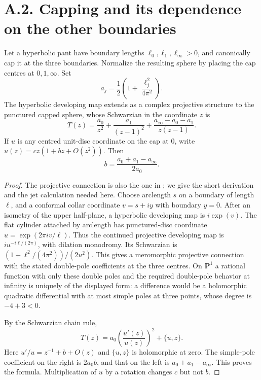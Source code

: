 \section{A.2. Capping and its dependence on the other boundaries}
\begin{proposition}\label{A2-schwarzian}
Let a hyperbolic pant have boundary lengths $\ell_0,\ell_1,\ell_\infty>0$, and canonically cap it at the three boundaries. Normalize the resulting sphere by placing the cap centres at $0,1,\infty$. Set
\[
a_j=\frac12\left(1+\frac{\ell_j^2}{4\pi^2}\right).
\]
The hyperbolic developing map extends as a complex projective structure to the punctured capped sphere, whose Schwarzian in the coordinate $z$ is
\[
T(z)=\frac{a_0}{z^2}+\frac{a_1}{(z-1)^2}
       +\frac{a_\infty-a_0-a_1}{z(z-1)}.
\]
If $u$ is any centred unit-disc coordinate on the cap at $0$, write $u(z)=c z(1+bz+O(z^2))$. Then
\[
b=\frac{a_0+a_1-a_\infty}{2a_0}.
\]
\end{proposition}
\begin{proof}
The projective connection is also the one in \cite[equation (1.3)]{AFirat2021}; we give the short derivation and the jet calculation needed here. Choose arclength $s$ on a boundary of length $\ell$, and a conformal collar coordinate $v=s+iy$ with boundary $y=0$. After an isometry of the upper half-plane, a hyperbolic developing map is $i\exp(v)$. The flat cylinder attached by arclength has punctured-disc coordinate $u=\exp(2\pi i v/\ell)$. Thus the continued projective developing map is $i u^{-i\ell/(2\pi)}$, with dilation monodromy. Its Schwarzian is $(1+\ell^2/(4\pi^2))/(2u^2)$. This gives a meromorphic projective connection with the stated double-pole coefficients at the three centres. On $\mathbf P^1$ a rational function with only these double poles and the required double-pole behavior at infinity is uniquely of the displayed form: a difference would be a holomorphic quadratic differential with at most simple poles at three points, whose degree is $-4+3<0$.

By the Schwarzian chain rule,
\[
T(z)=a_0\left(\frac{u'(z)}{u(z)}\right)^2+\{u,z\}.
\]
Here $u'/u=z^{-1}+b+O(z)$ and $\{u,z\}$ is holomorphic at zero. The simple-pole coefficient on the right is $2a_0b$, and that on the left is $a_0+a_1-a_\infty$. This proves the formula. Multiplication of $u$ by a rotation changes $c$ but not $b$.
\end{proof}

